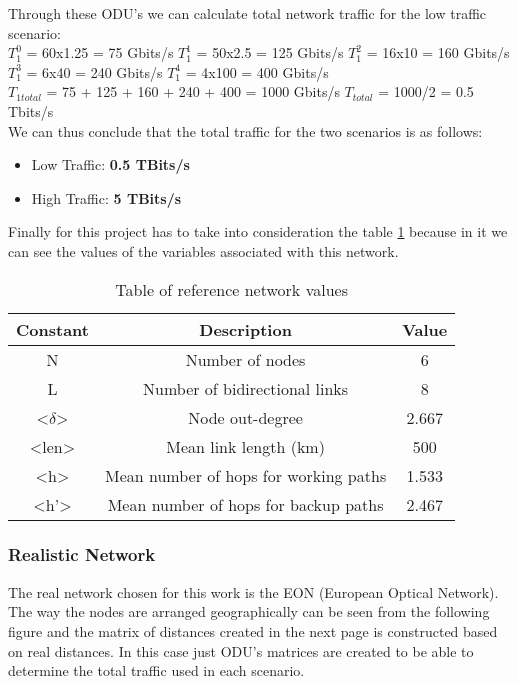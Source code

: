 Through these ODU's we can calculate total network traffic for the low traffic scenario:\\
$T_1^0$ = 60x1.25 = 75 Gbits/s \qquad
$T_1^1$ = 50x2.5 = 125 Gbits/s \qquad
$T_1^2$ = 16x10 = 160 Gbits/s \\
$T_1^3$ = 6x40 = 240 Gbits/s \quad
$T_1^4$ = 4x100 = 400 Gbits/s \\
$T_{1total}$ = 75 + 125 + 160 + 240 + 400 = 1000 Gbits/s \qquad
$T_{total}$ = 1000/2 = 0.5 Tbits/s\\

We can thus conclude that the total traffic for the two scenarios is as follows:
\begin{itemize}
  \item Low Traffic: \textbf{0.5 TBits/s}
  \item High Traffic: \textbf{5 TBits/s}
\end{itemize}

Finally for this project has to take into consideration the table \ref{table:1} because in it we can see the values of the variables associated with this network.
\begin{table}[h!]
\centering
\begin{tabular}{|| c | c | c||}
 \hline
 Constant & Description & Value \\
 \hline\hline
 N & Number of nodes & 6 \\
 L & Number of bidirectional links & 8 \\
 <$\delta$> & Node out-degree & 2.667 \\
 <len> & Mean link length (km) & 500 \\
 <h> & Mean number of hops for working paths & 1.533 \\
 <h'> & Mean number of hops for backup paths & 2.467 \\
 \hline
\end{tabular}
\caption{Table of reference network values}
\label{table:1}
\end{table}


\subsubsection{Realistic Network}
The real network chosen for this work is the EON (European Optical Network).
The way the nodes are arranged geographically can be seen from the following figure and the matrix of distances created in the next page is constructed based on real distances.
In this case just ODU's matrices are created to be able to determine the total traffic used in each scenario.

